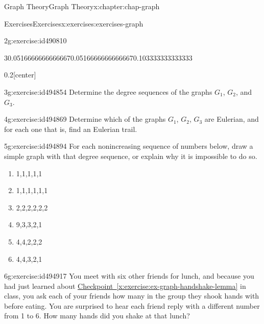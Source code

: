 \documentclass[oneside,10pt,]{book}
\newcommand{\xreffont}{\relax}
\numberwithin{equation}{section}
\begin{document}
\begin{chapterptx}{Graph Theory}{}{Graph Theory}{}{}{x:chapter:chap-graph}
\begin{exercises-section}{Exercises}{}{Exercises}{}{}{x:exercises:exercises-graph}
\begin{divisionexercise}{2}{}{}{g:exercise:id490810}
\begin{sidebyside}{3}{0.0516666666666667}{0.0516666666666667}{0.103333333333333}
\begin{sbspanel}{0.2}[center]
{
}%
\end{sbspanel}%
\end{sidebyside}%
\end{divisionexercise}%
\begin{divisionexercise}{3}{}{}{g:exercise:id494854}%
Determine the degree sequences of the graphs \(G_1\), \(G_2\), and \(G_3\).%
\end{divisionexercise}%
\begin{divisionexercise}{4}{}{}{g:exercise:id494869}%
Determine which of the graphs \(G_1\), \(G_2\), \(G_3\) are Eulerian, and for each one that is, find an Eulerian trail.%
\end{divisionexercise}%
\begin{divisionexercise}{5}{}{}{g:exercise:id494894}%
For each nonincreasing sequence of numbers below, draw a simple graph with that degree sequence, or explain why it is impossible to do so.%
\begin{enumerate}[label=(\alph*)]
\item{}1,1,1,1,1%
\item{}1,1,1,1,1,1%
\item{}2,2,2,2,2,2%
\item{}9,3,3,2,1%
\item{}4,4,2,2,2%
\item{}4,4,3,2,1%
\end{enumerate}
%
\end{divisionexercise}%
\begin{divisionexercise}{6}{}{}{g:exercise:id494917}%
You meet with six other friends for lunch, and because you had just learned about \hyperref[x:exercise:ex-graph-handshake-lemma]{Checkpoint~{\xreffont\ref{x:exercise:ex-graph-handshake-lemma}}} in class, you ask each of your friends how many in the group they shook hands with before eating. You are surprised to hear each friend reply with a different number from 1 to 6. How many hands did you shake at that lunch?%

\end{divisionexercise}
\end{exercises-section}
\end{chapterptx}
\end{document}
